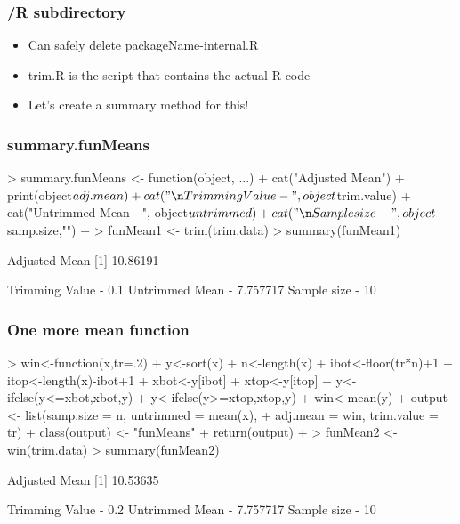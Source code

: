 \documentclass[xcolor=svgnames]{beamer}
\begin{document}
\begin{frame}
  \frametitle{/R subdirectory}
  \begin{itemize}
  \item Can safely delete packageName-internal.R
  \item trim.R is the script that contains the actual R code
  \item Let's create a summary method for this! 
  \end{itemize}
\end{frame}

\begin{frame}[fragile]
  \frametitle{summary.funMeans}
\begin{Schunk}
\begin{Sinput}
>   summary.funMeans <- function(object, ...){
+       cat("\n Adjusted Mean\n")
+       print(object$adj.mean)
+       cat("\n Trimming Value - ", object$trim.value)
+       cat("\n Untrimmed Mean - ", object$untrimmed)
+       cat("\n Sample size - ", object$samp.size,"\n")
+   }
> funMean1 <- trim(trim.data)
> summary(funMean1)
\end{Sinput}
\begin{Soutput}
 Adjusted Mean
[1] 10.86191

 Trimming Value -  0.1
 Untrimmed Mean -  7.757717
 Sample size -  10 
\end{Soutput}
\end{Schunk}
\end{frame}

\begin{frame}[fragile]
\frametitle{One more mean function}
\begin{scriptsize}
\begin{Schunk}
\begin{Sinput}
> win<-function(x,tr=.2){
+    y<-sort(x)
+    n<-length(x)
+    ibot<-floor(tr*n)+1
+    itop<-length(x)-ibot+1
+    xbot<-y[ibot]
+    xtop<-y[itop]
+    y<-ifelse(y<=xbot,xbot,y)
+    y<-ifelse(y>=xtop,xtop,y)
+    win<-mean(y)
+    output <- list(samp.size = n, untrimmed = mean(x),
+                   adj.mean = win, trim.value = tr)
+     class(output) <- "funMeans"
+     return(output)
+ }
> funMean2 <- win(trim.data)
> summary(funMean2)
\end{Sinput}
\begin{Soutput}
 Adjusted Mean
[1] 10.53635

 Trimming Value -  0.2
 Untrimmed Mean -  7.757717
 Sample size -  10 
\end{Soutput}
\end{Schunk}
\end{scriptsize}
\end{frame}
\end{document}
